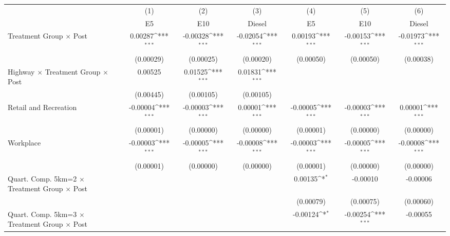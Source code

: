 {
\def\sym#1{\ifmmode^{#1}\else\(^{#1}\)\fi}
\begin{tabular}{l*{6}{c}}
\toprule
                    &\multicolumn{1}{c}{(1)}&\multicolumn{1}{c}{(2)}&\multicolumn{1}{c}{(3)}&\multicolumn{1}{c}{(4)}&\multicolumn{1}{c}{(5)}&\multicolumn{1}{c}{(6)}\\
                    &\multicolumn{1}{c}{E5}&\multicolumn{1}{c}{E10}&\multicolumn{1}{c}{Diesel}&\multicolumn{1}{c}{E5}&\multicolumn{1}{c}{E10}&\multicolumn{1}{c}{Diesel}\\
\midrule
Treatment Group $\times$ Post&     0.00287\sym{***}&    -0.00328\sym{***}&    -0.02054\sym{***}&     0.00193\sym{***}&    -0.00153\sym{***}&    -0.01973\sym{***}\\
                    &   (0.00029)         &   (0.00025)         &   (0.00020)         &   (0.00050)         &   (0.00050)         &   (0.00038)         \\
Highway $\times$ Treatment Group $\times$ Post&     0.00525         &     0.01525\sym{***}&     0.01831\sym{***}&                     &                     &                     \\
                    &   (0.00445)         &   (0.00105)         &   (0.00105)         &                     &                     &                     \\
Retail and Recreation&    -0.00004\sym{***}&    -0.00003\sym{***}&     0.00001\sym{***}&    -0.00005\sym{***}&    -0.00003\sym{***}&     0.00001\sym{***}\\
                    &   (0.00001)         &   (0.00000)         &   (0.00000)         &   (0.00001)         &   (0.00000)         &   (0.00000)         \\
Workplace           &    -0.00003\sym{***}&    -0.00005\sym{***}&    -0.00008\sym{***}&    -0.00003\sym{***}&    -0.00005\sym{***}&    -0.00008\sym{***}\\
                    &   (0.00001)         &   (0.00000)         &   (0.00000)         &   (0.00001)         &   (0.00000)         &   (0.00000)         \\
Quart. Comp. 5km=2 $\times$ Treatment Group $\times$ Post&                     &                     &                     &     0.00135\sym{*}  &    -0.00010         &    -0.00006         \\
                    &                     &                     &                     &   (0.00079)         &   (0.00075)         &   (0.00060)         \\
Quart. Comp. 5km=3 $\times$ Treatment Group $\times$ Post&                     &                     &                     &    -0.00124\sym{*}  &    -0.00254\sym{***}&    -0.00055         \\

\end{tabular}}
